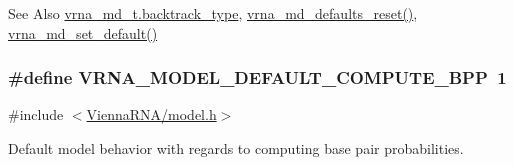 \begin{DoxySeeAlso}{See Also}
\hyperlink{group__model__details_abb265da25121d22ed11c8435861f0e53}{vrna\-\_\-md\-\_\-t.\-backtrack\-\_\-type}, \hyperlink{group__model__details_ga70834424cf804d149937de89f80ceb45}{vrna\-\_\-md\-\_\-defaults\-\_\-reset()}, \hyperlink{group__model__details_ga8ac6ff84936282436f822644bf841f66}{vrna\-\_\-md\-\_\-set\-\_\-default()} 
\end{DoxySeeAlso}
\hypertarget{group__model__details_ga1d6cd5051940b126c248147c011bac6c}{
\subsubsection[{V\-R\-N\-A\-\_\-\-M\-O\-D\-E\-L\-\_\-\-D\-E\-F\-A\-U\-L\-T\-\_\-\-C\-O\-M\-P\-U\-T\-E\-\_\-\-B\-P\-P}]{\setlength{\rightskip}{0pt plus 5cm}\#define V\-R\-N\-A\-\_\-\-M\-O\-D\-E\-L\-\_\-\-D\-E\-F\-A\-U\-L\-T\-\_\-\-C\-O\-M\-P\-U\-T\-E\-\_\-\-B\-P\-P~1}}\label{group__model__details_ga1d6cd5051940b126c248147c011bac6c}


{\ttfamily \#include $<$\hyperlink{model_8h}{Vienna\-R\-N\-A/model.\-h}$>$}



Default model behavior with regards to computing base pair probabilities. 

